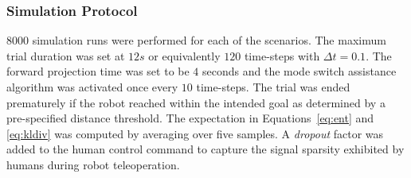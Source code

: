 \documentclass[conference]{IEEEtran}
\begin{document}
\subsubsection{Simulation Protocol}
8000 simulation runs were performed for each of the scenarios. 
The maximum trial duration was set at $12s$ or equivalently $120$ time-steps with $\Delta t = 0.1$. The forward projection time was set to be $4$ seconds and the mode switch assistance algorithm was activated once every $10$ time-steps. The trial was ended prematurely if the robot reached within the intended goal as determined by a pre-specified distance threshold. The expectation in Equations~\ref{eq:ent} and \ref{eq:kldiv} was computed by averaging over five samples.  A \textit{dropout} factor was added to the human control command to capture the signal sparsity exhibited by humans during robot teleoperation. 
\end{document}
